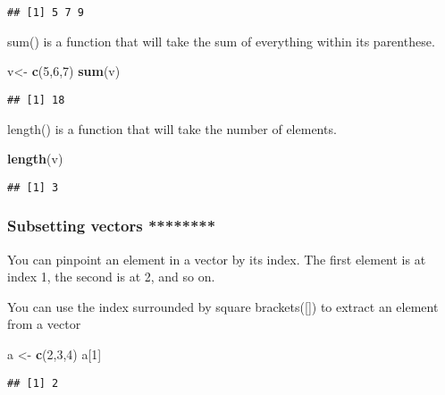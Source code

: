 \documentclass[
]{article}
\newenvironment{Shaded}{\begin{snugshade}}{\end{snugshade}}
\newcommand{\DecValTok}[1]{\textcolor[rgb]{0.00,0.00,0.81}{#1}}
\newcommand{\KeywordTok}[1]{\textcolor[rgb]{0.13,0.29,0.53}{\textbf{#1}}}
\newcommand{\NormalTok}[1]{#1}
\newcommand{\StringTok}[1]{\textcolor[rgb]{0.31,0.60,0.02}{#1}}
\begin{document}
\begin{verbatim}
## [1] 5 7 9
\end{verbatim}

sum() is a function that will take the sum of everything within its
parenthese.

\begin{Shaded}
\begin{Highlighting}[]
\NormalTok{  v<-}\StringTok{ }\KeywordTok{c}\NormalTok{(}\DecValTok{5}\NormalTok{,}\DecValTok{6}\NormalTok{,}\DecValTok{7}\NormalTok{)}
  \KeywordTok{sum}\NormalTok{(v)}
\end{Highlighting}
\end{Shaded}

\begin{verbatim}
## [1] 18
\end{verbatim}

length() is a function that will take the number of elements.

\begin{Shaded}
\begin{Highlighting}[]
\KeywordTok{length}\NormalTok{(v)}
\end{Highlighting}
\end{Shaded}

\begin{verbatim}
## [1] 3
\end{verbatim}

\hypertarget{subsetting-vectors}{%
\subsubsection{Subsetting vectors ********}\label{subsetting-vectors}}

You can pinpoint an element in a vector by its index. The first element
is at index 1, the second is at 2, and so on.

You can use the index surrounded by square brackets({[}{]}) to extract
an element from a vector

\begin{Shaded}
\begin{Highlighting}[]
\NormalTok{a <-}\StringTok{ }\KeywordTok{c}\NormalTok{(}\DecValTok{2}\NormalTok{,}\DecValTok{3}\NormalTok{,}\DecValTok{4}\NormalTok{)}
\NormalTok{a[}\DecValTok{1}\NormalTok{]}
\end{Highlighting}
\end{Shaded}

\begin{verbatim}
## [1] 2
\end{verbatim}
\end{document}
